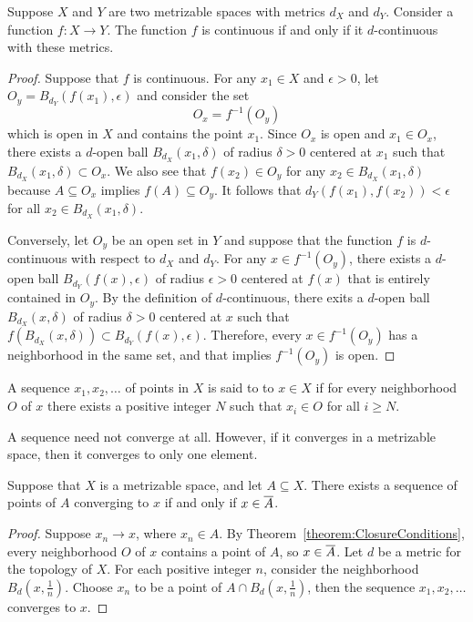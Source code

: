 \begin{theorem}
Suppose $X$ and $Y$ are two metrizable spaces with metrics $d_X$ and $d_Y$.
Consider a function $f : X \rightarrow Y$.
The function $f$ is continuous if and only if it $d$-continuous with these metrics.
\end{theorem}
\begin{proof}
Suppose that $f$ is continuous.
For any $x_1 \in X$ and $\epsilon > 0$, let $O_y =  B_{d_Y} (f(x_1), \epsilon)$ and consider the set
\begin{equation*}
O_x = f^{-1} \left( O_y \right)
\end{equation*}
which is open in $X$ and contains the point $x_1$.
Since $O_x$ is open and $x_1 \in O_x$, there exists a $d$-open ball $B_{d_X} (x_1, \delta)$ of radius $\delta>0$ centered at $x_1$ such that $B_{d_X} (x_1, \delta) \subset O_x$.
We also see that $f(x_2) \in O_y$ for any $x_2 \in B_{d_X} (x_1, \delta)$ because $A \subseteq O_x$ implies $f(A) \subseteq O_y$.
It follows that $d_Y \left( f(x_1), f(x_2) \right) < \epsilon$ for all $x_2 \in B_{d_X} (x_1, \delta)$.

Conversely, let $O_y$ be an open set in $Y$ and suppose that the function $f$ is $d$-continuous with respect to $d_X$ and $d_Y$.
For any $x \in f^{-1} (O_y)$, there exists a $d$-open ball $B_{d_Y} (f(x), \epsilon)$ of radius $\epsilon>0$ centered at $f(x)$ that is entirely contained in $O_y$.
By the definition of $d$-continuous, there exits a $d$-open ball $B_{d_X} (x, \delta)$ of radius $\delta>0$ centered at $x$ such that $f \left( B_{d_X} (x,\delta) \right) \subset B_{d_Y} \left( f(x), \epsilon \right)$.
Therefore, every $x \in f^{-1}(O_y)$ has a neighborhood in the same set, and that implies $f^{-1} (O_y)$ is open.
\end{proof}

\begin{definition} \label{definition:SequenceConvergence}
A sequence $x_1, x_2, \ldots$ of points in $X$ is said to  to $x \in X$ if for every neighborhood $O$ of $x$ there exists a positive integer $N$ such that $x_i \in O$ for all $i \geq N$.
\end{definition}

A sequence need not converge at all.
However, if it converges in a metrizable space, then it converges to only one element.

\begin{theorem}
Suppose that $X$ is a metrizable space, and let $A \subseteq X$.
There exists a sequence of points of $A$ converging to $x$ if and only if $x \in \overline{A}$.
\end{theorem}
\begin{proof}
Suppose $x_n \rightarrow x$, where $x_n \in A$.
By Theorem~\ref{theorem:ClosureConditions}, every neighborhood $O$ of $x$ contains a point of $A$, so $x \in \overline{A}$.
Let $d$ be a metric for the topology of $X$.
For each positive integer $n$, consider the neighborhood $B_d \left( x, \frac{1}{n} \right)$.
Choose $x_n$ to be a point of $A \cap B_d \left( x, \frac{1}{n} \right)$,
then the sequence $x_1, x_2, \ldots$ converges to $x$.
\end{proof}

